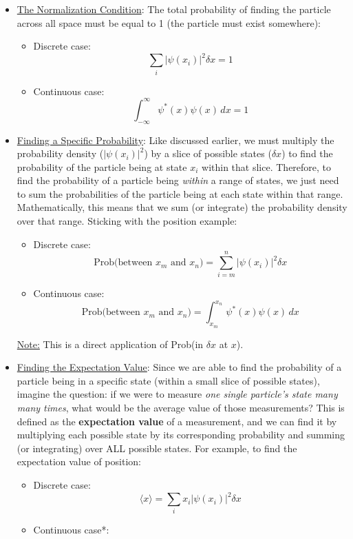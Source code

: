 \documentclass[12pt]{article}
\begin{document}
\begin{itemize}
    \item \underline{The Normalization Condition}: The total probability of finding the particle across all space must be equal to 1 (the particle must exist somewhere):
    \begin{itemize}
        \item Discrete case:
        \[\sum_i |\psi(x_i)|^2 \delta x = 1\]
        \item Continuous case:
        \[\int_{-\infty}^{\infty} \psi^*(x)\psi(x)\, dx = 1\]
    \end{itemize}
    \item \underline{Finding a Specific Probability}: Like discussed earlier, we must multiply the probability density ($|\psi(x_i)|^2$) by a slice of possible states ($\delta x$) to find the probability of the particle being at state $x_i$ within that slice. Therefore, to find the probability of a particle being \textit{within} a range of states, we just need to sum the probabilities of the particle being at each state within that range. Mathematically, this means that we sum (or integrate) the probability density over that range. Sticking with the position example:
    \begin{itemize}
        \item Discrete case:
        \[\text{Prob(between $x_m$ and $x_n$)} = \sum_{i=m}^{n} |\psi(x_i)|^2 \delta x\]
        \item Continuous case:
        \[\text{Prob(between $x_m$ and $x_n$)} = \int_{x_m}^{x_n} \psi^*(x)\psi(x)\, dx\]
    \end{itemize}
    \underline{Note:} This is a direct application of Prob(in $\delta x$ at $x$).
    \item \underline{Finding the Expectation Value}: Since we are able to find the probability of a particle being in a specific state (within a small slice of possible states), imagine the question: if we were to measure \textit{one single particle's state many many times}, what would be the average value of those measurements? This is defined as the \textbf{expectation value} of a measurement, and we can find it by multiplying each possible state by its corresponding probability and summing (or integrating) over ALL possible states. For example, to find the expectation value of position:
    \begin{itemize}
        \item Discrete case:
        \[\langle x \rangle = \sum_i x_i |\psi(x_i)|^2 \delta x\]
        \item Continuous case*:

\end{itemize}
\end{itemize}
\end{document}
